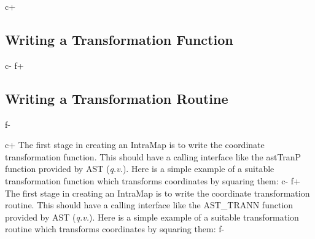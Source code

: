 \documentclass[twoside,11pt]{article}
\newcommand{\xlabel}[1]{}
\begin{document}
c+
\subsection{\label{ss:transformationfunctions}Writing a Transformation Function}
c-
f+
\subsection{\label{ss:transformationfunctions}Writing a Transformation Routine}
f-

c+
The first stage in creating an IntraMap is to write the coordinate
transformation function. This should have a calling interface like the
astTranP function provided by AST ({\em{q.v.}}). Here is a simple
example of a suitable transformation function which transforms
coordinates by squaring them:
c-
f+
The first stage in creating an IntraMap is to write the coordinate
transformation routine. This should have a calling interface like the
AST\_TRANN function provided by AST ({\em{q.v.}}). Here is a simple
example of a suitable transformation routine which transforms
coordinates by squaring them:
f-
\xlabel{SqrTran}
\end{document}
